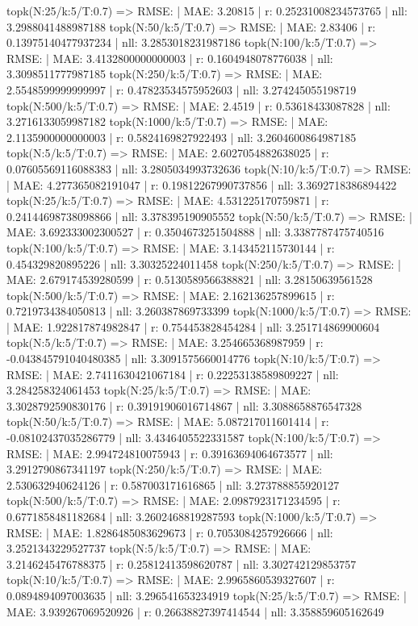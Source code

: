 topk(N:25/k:5/T:0.7) => RMSE: | MAE: 3.20815 | r: 0.25231008234573765 | nll: 3.2988041488987188
topk(N:50/k:5/T:0.7) => RMSE: | MAE: 2.83406 | r: 0.13975140477937234 | nll: 3.2853018231987186
topk(N:100/k:5/T:0.7) => RMSE: | MAE: 3.4132800000000003 | r: 0.1604948078776038 | nll: 3.3098511777987185
topk(N:250/k:5/T:0.7) => RMSE: | MAE: 2.5548599999999997 | r: 0.47823534575952603 | nll: 3.274245055198719
topk(N:500/k:5/T:0.7) => RMSE: | MAE: 2.4519 | r: 0.53618433087828 | nll: 3.2716133059987182
topk(N:1000/k:5/T:0.7) => RMSE: | MAE: 2.1135900000000003 | r: 0.5824169827922493 | nll: 3.2604600864987185
topk(N:5/k:5/T:0.7) => RMSE: | MAE: 2.6027054882638025 | r: 0.07605569116088383 | nll: 3.2805034993732636
topk(N:10/k:5/T:0.7) => RMSE: | MAE: 4.277365082191047 | r: 0.19812267990737856 | nll: 3.3692718386894422
topk(N:25/k:5/T:0.7) => RMSE: | MAE: 4.531225170759871 | r: 0.24144698738098866 | nll: 3.378395190905552
topk(N:50/k:5/T:0.7) => RMSE: | MAE: 3.692333002300527 | r: 0.3504673251504888 | nll: 3.3387787475740516
topk(N:100/k:5/T:0.7) => RMSE: | MAE: 3.143452115730144 | r: 0.454329820895226 | nll: 3.30325224011458
topk(N:250/k:5/T:0.7) => RMSE: | MAE: 2.679174539280599 | r: 0.5130589566388821 | nll: 3.28150639561528
topk(N:500/k:5/T:0.7) => RMSE: | MAE: 2.162136257899615 | r: 0.7219734384050813 | nll: 3.260387869733399
topk(N:1000/k:5/T:0.7) => RMSE: | MAE: 1.922817874982847 | r: 0.754453828454284 | nll: 3.251714869900604
topk(N:5/k:5/T:0.7) => RMSE: | MAE: 3.254665368987959 | r: -0.043845791040480385 | nll: 3.3091575660014776
topk(N:10/k:5/T:0.7) => RMSE: | MAE: 2.7411630421067184 | r: 0.22253138589809227 | nll: 3.284258324061453
topk(N:25/k:5/T:0.7) => RMSE: | MAE: 3.3028792590830176 | r: 0.39191906016714867 | nll: 3.3088658876547328
topk(N:50/k:5/T:0.7) => RMSE: | MAE: 5.087217011601414 | r: -0.08102437035286779 | nll: 3.4346405522331587
topk(N:100/k:5/T:0.7) => RMSE: | MAE: 2.994724810075943 | r: 0.39163694064673577 | nll: 3.2912790867341197
topk(N:250/k:5/T:0.7) => RMSE: | MAE: 2.530632940624126 | r: 0.587003171616865 | nll: 3.273788855920127
topk(N:500/k:5/T:0.7) => RMSE: | MAE: 2.0987923171234595 | r: 0.6771858481182684 | nll: 3.2602468819287593
topk(N:1000/k:5/T:0.7) => RMSE: | MAE: 1.8286485083629673 | r: 0.7053084257926666 | nll: 3.2521343229527737
topk(N:5/k:5/T:0.7) => RMSE: | MAE: 3.2146245476788375 | r: 0.25812413598620787 | nll: 3.302742129853757
topk(N:10/k:5/T:0.7) => RMSE: | MAE: 2.9965860539327607 | r: 0.0894894097003635 | nll: 3.296541653234919
topk(N:25/k:5/T:0.7) => RMSE: | MAE: 3.939267069520926 | r: 0.26638827397414544 | nll: 3.358859605162649
